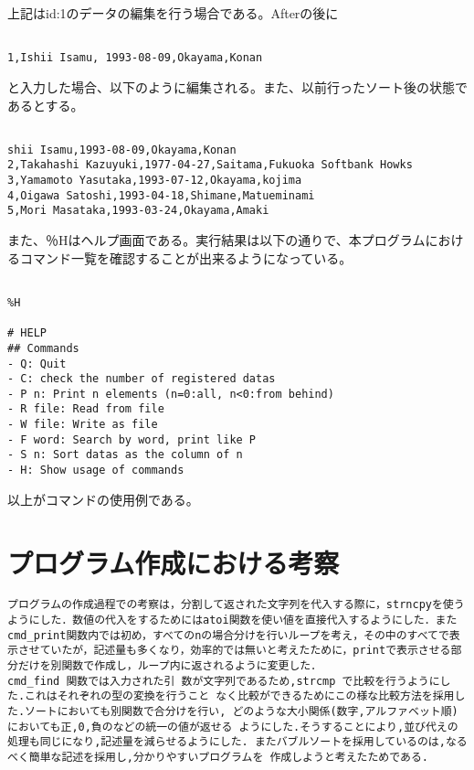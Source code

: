 \documentclass[a4j]{jarticle}
\begin{document}
上記はid:1のデータの編集を行う場合である。Afterの後に

{\baselineskip 3mm
\begin{verbatim}

1,Ishii Isamu, 1993-08-09,Okayama,Konan

\end{verbatim}
}

と入力した場合、以下のように編集される。また、以前行ったソート後の状態であるとする。

{\baselineskip 3mm
\begin{verbatim}

shii Isamu,1993-08-09,Okayama,Konan
2,Takahashi Kazuyuki,1977-04-27,Saitama,Fukuoka Softbank Howks
3,Yamamoto Yasutaka,1993-07-12,Okayama,kojima
4,Oigawa Satoshi,1993-04-18,Shimane,Matueminami
5,Mori Masataka,1993-03-24,Okayama,Amaki

\end{verbatim}
}

また、％Hはヘルプ画面である。実行結果は以下の通りで、本プログラムにおけるコマンド一覧を確認することが出来るようになっている。

{\baselineskip 3mm
\begin{verbatim}

%H

# HELP
## Commands
- Q: Quit
- C: check the number of registered datas
- P n: Print n elements (n=0:all, n<0:from behind)
- R file: Read from file
- W file: Write as file
- F word: Search by word, print like P
- S n: Sort datas as the column of n
- H: Show usage of commands

\end{verbatim}
}

以上がコマンドの使用例である。


%
%

\section{プログラム作成における考察}

\begin{verbatim}
プログラムの作成過程での考察は，分割して返された文字列を代入する際に，strncpyを使うようにした．数値の代入をするためにはatoi関数を使い値を直接代入するようにした．またcmd_print関数内では初め，すべてのnの場合分けを行いループを考え，その中のすべてで表示させていたが，記述量も多くなり，効率的では無いと考えたために，printで表示させる部分だけを別関数で作成し，ループ内に返されるように変更した．
cmd_find 関数では入力された引 数が文字列であるため,strcmp で比較を行うようにした.これはそれぞれの型の変換を行うこと なく比較ができるためにこの様な比較方法を採用した.ソートにおいても別関数で合分けを行い, どのような大小関係(数字,アルファベット順)においても正,0,負のなどの統一の値が返せる ようにした.そうすることにより,並び代えの処理も同じになり,記述量を減らせるようにした. またバブルソートを採用しているのは,なるべく簡単な記述を採用し,分かりやすいプログラムを 作成しようと考えたためである.

\end{verbatim}
\end{document}
